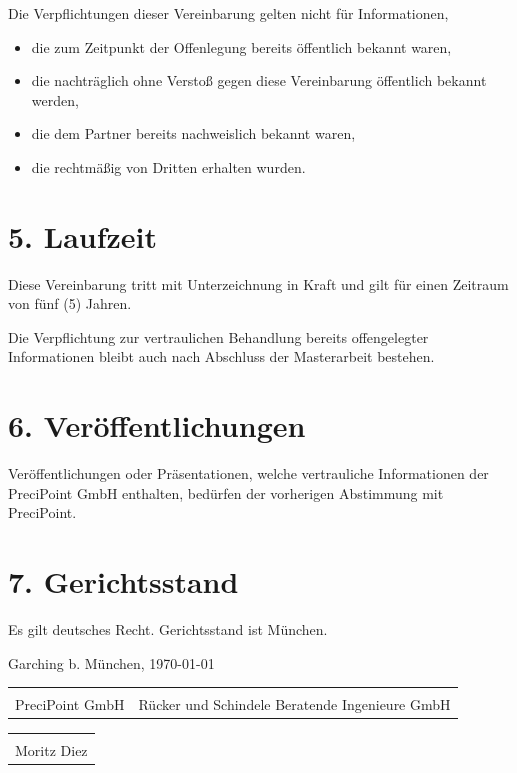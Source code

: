 \documentclass[11pt]{article}
\begin{document}
Die Verpflichtungen dieser Vereinbarung gelten nicht für Informationen,

\begin{itemize}
    \item die zum Zeitpunkt der Offenlegung bereits öffentlich bekannt waren,
    \item die nachträglich ohne Verstoß gegen diese Vereinbarung öffentlich bekannt werden,
    \item die dem Partner bereits nachweislich bekannt waren,
    \item die rechtmäßig von Dritten erhalten wurden.
\end{itemize}

\section*{5. Laufzeit}

Diese Vereinbarung tritt mit Unterzeichnung in Kraft und gilt für einen Zeitraum von fünf (5) Jahren.

Die Verpflichtung zur vertraulichen Behandlung bereits offengelegter Informationen bleibt auch nach Abschluss der Masterarbeit bestehen.

\section*{6. Veröffentlichungen}

Veröffentlichungen oder Präsentationen, welche vertrauliche Informationen der PreciPoint GmbH enthalten, bedürfen der vorherigen Abstimmung mit PreciPoint.

\section*{7. Gerichtsstand}

Es gilt deutsches Recht. Gerichtsstand ist München.

\vspace{2cm}

\noindent
Garching b. München, \today

\vspace{2cm}

\begin{tabular}{p{7cm} p{7cm}}
\hrulefill & \hrulefill \\
PreciPoint GmbH & Rücker und Schindele Beratende Ingenieure GmbH \\
\end{tabular}

\vspace{2cm}

\begin{tabular}{p{7cm}}
\hrulefill \\
Moritz Diez \\
\end{tabular}
\end{document}

